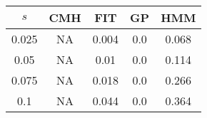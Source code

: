 \centering \begin{tabular}{c|c|c|c|c}
$s$	&CMH	&FIT	&GP	&HMM\\\hline
0.025	&NA	&0.004	&0.0	&0.068\\
0.05	&NA	&0.01	&0.0	&0.114\\
0.075	&NA	&0.018	&0.0	&0.266\\
0.1	&NA	&0.044	&0.0	&0.364\\
\end{tabular}
